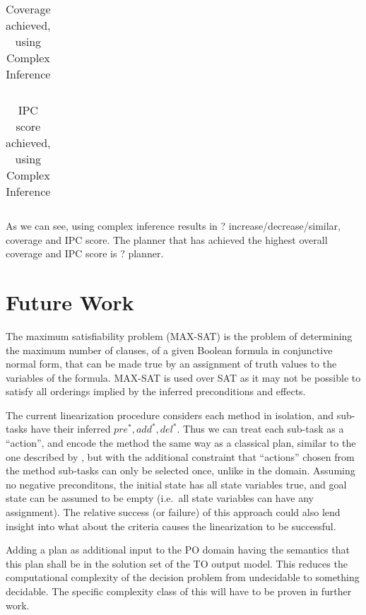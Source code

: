 \documentclass[letterpaper]{article} %
\newcommand{\PreS} {\ensuremath{\mathit{pre^{*}}}}
\newcommand{\AddS} {\ensuremath{\mathit{add^{*}}}}
\newcommand{\DelS} {\ensuremath{\mathit{del^{*}}}}
\begin{document}
\begin{table*}[h]
	\centering
	\caption{Coverage achieved, using Complex Inference}
	\scalebox{0.8} {
\begin{tabular}{lccccccccccccccccl} 
	\toprule 
\end{tabular}  
	}
\end{table*}

\begin{table*}[h]
	\centering
	\caption{IPC score achieved, using Complex Inference}
	\scalebox{0.9} {
\begin{tabular}{lccccccccccccccccl} 
	\toprule 
\end{tabular}
}
\end{table*}


As we can see, using complex inference results in ?  increase/decrease/similar, coverage and IPC score.
The planner that has achieved the highest overall coverage and IPC score is ? planner.




\section{Future Work}
The maximum satisfiability problem (MAX-SAT) is the problem of determining the maximum number of clauses, of a given Boolean formula in conjunctive normal form, that can be made true by an assignment of truth values to the variables of the formula. MAX-SAT is used over SAT as it may not be possible to satisfy all orderings implied by the inferred preconditions and effects.

The current linearization procedure considers each method in isolation, and sub-tasks have their inferred $\PreS, \AddS, \DelS$. Thus we can treat each sub-task as a \enquote{action}, and encode the method the same way as a classical plan, similar to the one described by \cite{RINTANEN201245}, but with the additional constraint that \enquote{actions} chosen from the method sub-tasks can only be selected once, unlike in the domain. Assuming no negative preconditons, the initial state has all state variables true, and goal state can be assumed to be empty (i.e.\ all state variables can have any assignment). The relative success (or failure) of this approach could also lend insight into what about the criteria causes the linearization to be successful.


Adding a plan as additional input to the PO domain having the
semantics that this plan shall be in the solution set of the TO output
model. This reduces the computational complexity of the decision problem from undecidable to something decidable. The specific complexity class of this will have to be proven in further work.  %
\end{document}
